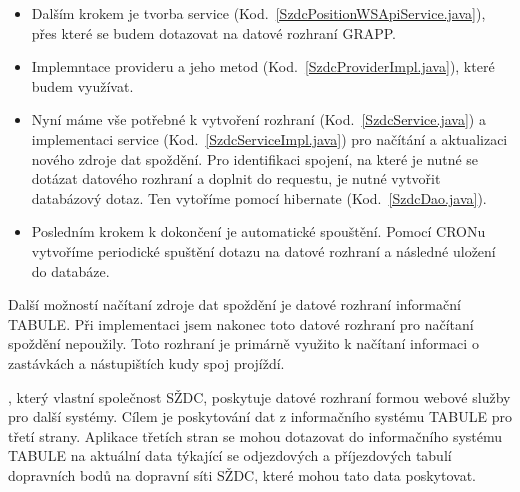 \begin{itemize}
 	\setlength{\parskip}{0pt}
 	\setlength{\itemsep}{0pt}


 
	\item Dalším krokem je tvorba service (Kod.~\ref{SzdcPositionWSApiService.java}), přes které se budem dotazovat na datové rozhraní GRAPP.
 
 
	\item Implemntace provideru a jeho metod (Kod.~\ref{SzdcProviderImpl.java}), které budem využívat.
 
 
	\item Nyní máme vše potřebné k vytvoření rozhraní (Kod.~\ref{SzdcService.java}) a implementaci service (Kod.~\ref{SzdcServiceImpl.java}) pro načítání a aktualizaci nového zdroje dat spoždění. Pro identifikaci spojení, na které je nutné se dotázat datového rozhraní a doplnit do requestu, je nutné vytvořit databázový dotaz. Ten vytoříme pomocí hibernate (Kod.~\ref{SzdcDao.java}).
	
	
	\item Posledním krokem k dokončení je automatické spouštění. Pomocí CRONu vytvoříme periodické spuštění dotazu na datové rozhraní a následné uložení do databáze.
	
\end{itemize} 

Další možností načítaní zdroje dat spoždění je datové rozhraní informační TABULE. Při implementaci jsem nakonec toto datové rozhraní pro načítaní spoždění nepoužily. Toto rozhraní je primárně využito k načítaní informaci o zastávkách a nástupištích kudy spoj projíždí.

, který vlastní společnost SŽDC, poskytuje datové rozhraní formou webové služby pro další systémy. Cílem je poskytování dat z informačního systému TABULE pro třetí strany. Aplikace třetích stran se mohou dotazovat do informačního systému TABULE na aktuální data týkající se odjezdových a příjezdových tabulí dopravních bodů na dopravní síti SŽDC, které mohou tato data poskytovat.

